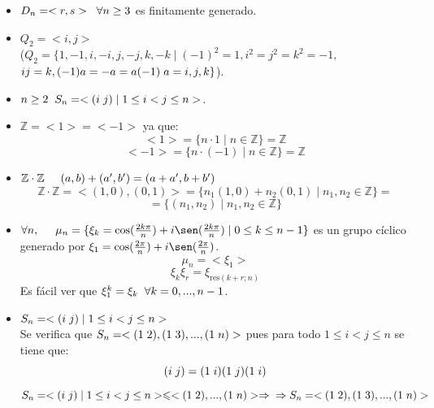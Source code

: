 \documentclass[11pt,a4paper]{article}
\begin{document}
\begin{itemize}
\item $D_{n} = <r,s> \hspace{0.2cm} \forall n \geq 3$ es finitamente generado.
\item $Q_{2} = <i,j>$ \\ ($Q_{2} = \{1, -1, i, -i, j, -j, k, -k \mid (-1)^{2} = 1, i^{2} = j^{2} = k^{2} = -1,$ \\ $ij = k, (-1)a = -a=a(-1) \hspace{0.1cm} a = i,j,k \}$).
\item $n \geq 2 \hspace{0.2cm} S_{n} = <(i \hspace{0.1cm} j) \mid 1 \leq i < j \leq n>$.
\item $\mathbb{Z} = < 1 > = < -1 >$ ya que:
$$<1> = \{ n \cdot 1 \mid n \in \mathbb{Z} \}  = \mathbb{Z}$$
$$<-1> = \{ n \cdot (-1) \mid n \in \mathbb{Z} \}  = \mathbb{Z}$$
\item $\mathbb{Z} \cdot \mathbb{Z} \hspace{0.5cm} (a,b)+(a',b') = (a+a', b+b')$
$$\mathbb{Z} \cdot \mathbb{Z} = < (1,0), (0,1) > = \{n_{1}(1,0) + n_{2}(0,1) \mid n_{1}, n_{2} \in \mathbb{Z}\} =$$ $$= \{(n_{1},n_{2}) \mid n_{1}, n_{2} \in \mathbb{Z}\} $$


\item $\forall n, \hspace{0.5cm} \mu_{n} = \{\xi_{k} = \cos(\frac{2k\pi}{n}) + i\sen(\frac{2k\pi}{n}) \mid 0 \leq k \leq n-1\}$ es un grupo cíclico generado por $\xi_{1} = \cos(\frac{2\pi}{n}) + i\sen(\frac{2\pi}{n})$.
$$\mu_{n} = <\xi_{1}>$$
$$\xi_{k}\xi_{r} = \xi_{\text{res}(k+r;n)}$$
Es fácil ver que $\xi_{1}^{k} = \xi_{k} \hspace{0.2cm} \forall k = 0, ..., n-1$.
\item $S_{n} = <(i \hspace{0.1cm} j) \mid 1 \leq i < j \leq n>$ \\
Se verifica que $S_{n} = <(1 \hspace{0.1cm} 2), (1 \hspace{0.1cm} 3), ..., (1 \hspace{0.1cm} n)>$ pues para todo $1 \leq i < j \leq n$ se tiene que:
$$(i \hspace{0.1cm} j) = (1 \hspace{0.1cm} i)(1 \hspace{0.1cm} j)(1 \hspace{0.1cm} i)$$
$S_{n} = <(i \hspace{0.1cm} j) \mid 1 \leq i < j \leq n > \leqslant <(1 \hspace{0.1cm} 2), ..., (1 \hspace{0.1cm} n)> \Rightarrow  \\ \Rightarrow S_{n} = <(1 \hspace{0.1cm} 2), (1 \hspace{0.1cm} 3), ..., (1 \hspace{0.1cm} n)>$
\end{itemize}
\end{document}
